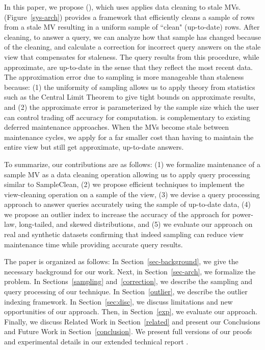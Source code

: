 In this paper, we propose \svcfull (\svc), which uses applies data cleaning to stale MVs.
\svc (Figure~\ref{sys-arch}) provides a framework that efficiently cleans a sample of rows from a stale MV resulting in a uniform sample of ``clean" (up-to-date) rows.
After cleaning, to answer a query, we can analyze how that sample has changed because of the cleaning, and calculate a correction for incorrect query answers on the stale view that compensates for staleness. 
The query results from this procedure, while approximate, are up-to-date in the sense that they reflect the most recent data. 
The approximation error due to sampling is more manageable than staleness because: (1) the uniformity of sampling allows us to apply theory from statistics such as the Central Limit Theorem to give tight bounds on approximate results, and (2) the approximate error is parameterized by the sample size which the user can control trading off accuracy for computation.
\svc is complementary to existing deferred maintenance approaches.
When the MVs become stale between maintenance cycles, we apply \svc for a far smaller cost than having to maintain the entire view but still get approximate, up-to-date answers.


To summarize, our contributions are as follows: (1) we formalize maintenance of a sample MV as a data cleaning operation allowing us to apply query processing similar to SampleClean, (2) we propose efficient techniques to implement the view-cleaning operation on a sample of the view, (3) we devise a query processing approach to answer queries accurately using the sample of up-to-date data, (4) we propose an outlier index to increase the accuracy of the approach for power-law, long-tailed, and skewed distributions, and (5) we evaluate our approach on real and synthetic datasets confirming that indeed sampling can reduce view maintenance time while providing accurate query results. 

The paper is organized as follows: 
In Section~\ref{sec-background}, we give the necessary background for our work.
Next, in Section~\ref{sec-arch}, we formalize the problem.
In Sections~\ref{sampling} and~\ref{correction}, we describe the sampling and query processing of our technique.
In Section~\ref{outlier}, we describe the outlier indexing framework.
In Section~\ref{sec:disc}, we discuss limitations and new opportunities of our approach.
Then, in Section~\ref{exp}, we evaluate our approach.
Finally, we discuss Related Work in Section~\ref{related} and present our Conclusions and Future Work in Section~\ref{conclusion}.
We present full versions of our proofs and experimental details in our extended technical report \cite{technicalReport}.

